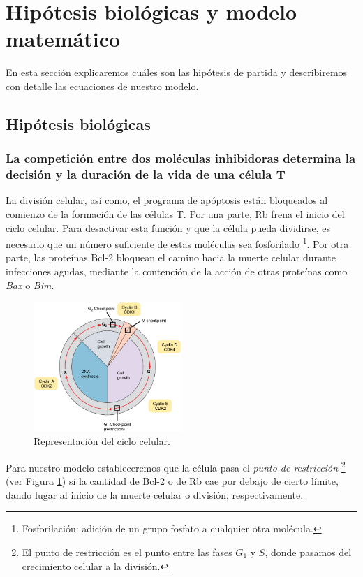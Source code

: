 \section{Hipótesis biológicas y modelo matemático}

En esta sección explicaremos cuáles son las hipótesis de partida y describiremos con detalle las ecuaciones de nuestro modelo. 

\subsection{Hipótesis biológicas} 
\label{subsec:hip_bio}

\subsubsection{La competición entre dos moléculas inhibidoras determina la decisión y la duración de la vida de una célula T}
\label{susubsec:hip_1}
	 
La división celular, así como, el programa de apóptosis están bloqueados al comienzo de la formación de las células T. Por una parte, Rb frena el inicio del ciclo celular. Para desactivar esta función y que la célula pueda dividirse, es necesario que un número suficiente de estas moléculas sea fosforilado \footnote{Fosforilación: adición de un grupo fosfato a cualquier otra molécula.}.  Por otra parte, las proteínas Bcl-2 bloquean el camino hacia la muerte celular durante infecciones agudas, mediante la contención de la acción de otras proteínas como \textit{Bax} o \textit{Bim}.


\begin{figure}[t]
	\centering
	\includegraphics[width=0.5\textwidth]{Cell_Cycle}
	\caption{Representación del ciclo celular.}
	\label{fig:ciclo celular}
\end{figure}

Para nuestro modelo estableceremos que la célula pasa el \textit{punto de restricción} \footnote{El punto de restricción es el punto entre las fases $G_{1}$ y $S$, donde pasamos del crecimiento celular a la división.} (ver Figura \ref{fig:ciclo celular}) si la cantidad de Bcl-2 o de Rb cae por debajo de cierto límite, dando lugar al inicio de la muerte celular o división, respectivamente. 

